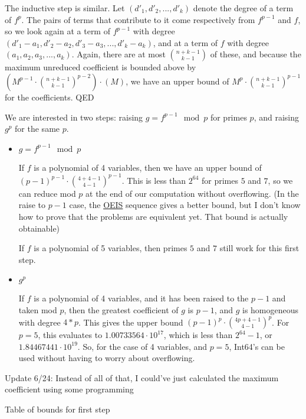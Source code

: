 \documentclass{article}
\begin{document}
The inductive step is similar. Let $(d'_1, d'_2, ... , d'_k)$ denote the degree of a term of $f^p$. The pairs of terms that contribute to it come respectively from $f^{p - 1}$ and $f$, so we look again at a term of $f^{p - 1}$ with degree $(d'_1 - a_1, d'_2 - a_2, d'_3 - a_3, ... , d'_k - a_k)$, and at a term of $f$ with degree $(a_1, a_2, a_3, ... , a_k)$. Again, there are at most $\binom{n + k - 1}{k - 1}$ of these, and because the maximum unreduced coefficient is bounded above by $\left(M^{p - 1} \cdot \binom{n + k - 1}{k - 1} ^ {p - 2}\right) \cdot (M)$, we have an upper bound of $M^p \cdot \binom{n + k - 1}{k - 1}^{p-1}$ for the coefficients. QED

We are interested in two steps: raising $g = f^{p - 1}\mod p$ for primes $p$, and raising $g ^ p$ for the same $p$.

\begin{itemize}
    \item $g = f^{p - 1}\mod p$
    
    If $f$ is a polynomial of 4 variables, then we have an upper bound of $(p - 1)^{p-1} \cdot \binom{4 + 4 - 1}{4 - 1}^{p - 1}$. This is less than $2^{64}$ for primes $5$ and $7$, so we can reduce mod $p$ at the end of our computation without overflowing. (In the raise to $p-1$ case, the \href{https://oeis.org/A333901/internal}{OEIS} sequence gives a better bound, but I don't know how to prove that the problems are equivalent yet. That bound is actually obtainable)

    If $f$ is a polynomial of 5 variables, then primes $5$ and $7$ still work for this first step.

    \item $g ^ p$
    
    If $f$ is a polynomial of 4 variables, and it has been raised to the $p-1$ and taken mod $p$, then the greatest coefficient of $g$ is $p-1$, and $g$ is homogeneous with degree $4 * p$. This gives the upper bound $(p - 1)^{p} \cdot \binom{4p + 4 - 1}{4 - 1}^{p}$. For $p=5$, this evaluates to $1.00733564 \cdot 10^{17}$, which is less than $2^{64} - 1$, or $1.84467441 \cdot 10^{19}$. So, for the case of 4 variables, and $p = 5$, Int64's can be used without having to worry about overflowing.
\end{itemize}

Update 6/24:
Instead of all of that, I could've just calculated the maximum coefficient using some programming

Table of bounds for first step
\end{document}
